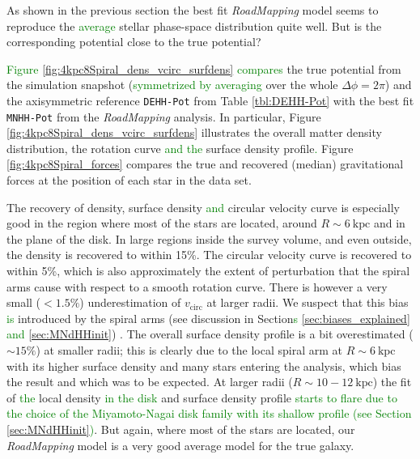 \documentclass[iop,revtex4,numberedappendix,appendixfloats]{emulateapj}
\newcommand{\RM}{{\sl RoadMapping}}
\newcommand{\NEW}[1]{\textcolor{Green}{#1}}
\newcommand{\OLD}[1]{}
\begin{document}
As shown in the previous section the best fit \RM{} model seems to reproduce the \NEW{average} stellar phase-space distribution quite well. But is the corresponding potential close to the true potential? 

\OLD{Figures \ref{fig:4kpc8Spiral_density}, \ref{fig:4kpc8Spiral_vcirc_surfdens} and \ref{fig:4kpc8Spiral_forces} compare}\NEW{Figure \ref{fig:4kpc8Spiral_dens_vcirc_surfdens} compares} the true potential from the simulation snapshot (\OLD{averaged}\NEW{symmetrized by averaging} over the whole $\Delta\phi=2\pi$) and the axisymmetric reference \texttt{DEHH-Pot} from Table \ref{tbl:DEHH-Pot} with the best fit \texttt{MNHH-Pot} from the \RM{} analysis. In particular, Figure \OLD{\ref{fig:4kpc8Spiral_density}}\NEW{\ref{fig:4kpc8Spiral_dens_vcirc_surfdens}} illustrates the overall matter density distribution, \OLD{Figure \ref{fig:4kpc8Spiral_vcirc_surfdens} }the rotation curve\OLD{,} \NEW{and the} surface density profile\NEW{.}\OLD{ and halo-to-disk ratio and} Figure \ref{fig:4kpc8Spiral_forces} compares the true and recovered (median) gravitational forces at the position of each star in the data set.

The recovery of density, surface density\OLD{,} \NEW{and} circular velocity curve \OLD{and disk-to-halo ratio} is especially good in the region where most of the stars are located, around $R\sim6~\text{kpc}$ and in the plane of the disk. In large regions inside the survey volume, and even outside, the density is recovered to within 15\%. The circular velocity curve is recovered to within 5\%, which is also approximately the extent of perturbation that the spiral arms cause with respect to a smooth rotation curve. There is however a very small ($<1.5\%$) underestimation of $v_\text{circ}$ at larger radii. We suspect that this \OLD{is a combination of a} bias \NEW{is} introduced by the spiral arms (see \OLD{also} discussion in Section\NEW{s} \OLD{\ref{sec:forces_bias}}\NEW{\ref{sec:biases_explained}} \NEW{and \ref{sec:MNdHHinit}}) \OLD{and the choice of potential model (as a similar bias shows up in the \texttt{DEHH-Pot})}. The overall surface density profile is a bit overestimated ($\sim 15\%$) at smaller radii; this is clearly due to the local spiral arm at $R\sim6~\text{kpc}$ with its higher surface density and many stars entering the analysis, which bias the result and which was to be expected. At larger radii ($R\sim10-12~\text{kpc}$) the fit of \OLD{radial}\NEW{the} local density \NEW{in the disk} and surface density profile \OLD{is not as accurate, which we ascribe to the Miyamoto-Nagai disk having a shallower radial profile than an exponential disk, and not enough stars in these outer regions to give good constraints}\NEW{starts to flare due to the choice of the Miyamoto-Nagai disk family with its shallow profile (see Section \ref{sec:MNdHHinit})}. \OLD{The much stronger bias in the disk-to-halo ratio at larger radii is the result of a misjudgment of the halo scale length. As we will see later (in Section \ref{sec:parameter recovery} and Figure \ref{fig:model_parameters}) we seem to need an even larger survey volume to have enough radial coverage to constrain the halo scale length properly.} But again, where most of the stars are located, our \RM{} model is a very good average model for the true galaxy.
\end{document}
